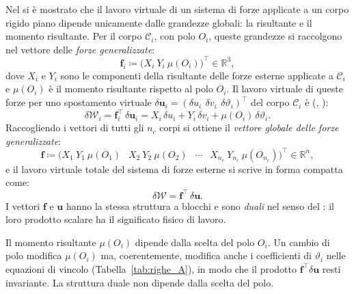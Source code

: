 Nel  si è mostrato che il lavoro virtuale di un
sistema di forze applicate a un corpo rigido piano dipende
unicamente dalle grandezze globali: la risultante e il momento
risultante. Per il corpo $\mathcal{C}_i$, con polo $O_i$,
queste grandezze si raccolgono nel vettore delle
\emph{forze generalizzate}:
\begin{equation}\label{eq:f_i}
	\bm{f}_i \coloneqq
	\bigl(X_i\ Y_i\ \mu(O_i)\bigr)^{\!\top} \in \mathbb{R}^3,
\end{equation}
dove $X_i$ e $Y_i$ sono le componenti della risultante delle
forze esterne applicate a $\mathcal{C}_i$ e $\mu(O_i)$ è il
momento risultante rispetto al polo $O_i$. Il lavoro virtuale
di queste forze per uno spostamento virtuale
$\delta\bm{u}_i = (\delta u_i\,\ \delta v_i\,\ \delta\vartheta_i)^\top$
del corpo $\mathcal{C}_i$ è (,
):
\begin{equation}\label{eq:dW_i}
	\delta\mathcal{W}_i = \bm{f}_i^{\top}\,\delta\bm{u}_i
	= X_i\,\delta u_i + Y_i\,\delta v_i
	+ \mu(O_i)\,\delta\vartheta_i.
\end{equation}
Raccogliendo i vettori di tutti gli $n_c$ corpi si ottiene
il \emph{vettore globale delle forze generalizzate}:
\begin{equation}\label{eq:f_glob}
	\bm{f} \coloneqq
	\bigl(
	X_1\ Y_1\ \mu(O_1)\ \;\;
	X_2\ Y_2\ \mu(O_2)\ \;\;
	\cdots\ \;\;
	X_{n_c}\ Y_{n_c}\ \mu(O_{n_c})
	\bigr)^{\!\top}
	\in \mathbb{R}^{n},
\end{equation}
e il lavoro virtuale totale del sistema di forze esterne si
scrive in forma compatta come:
\begin{equation}\label{eq:dW_tot}
	\delta\mathcal{W} = \bm{f}^{\top}\,\delta\bm{u}.
\end{equation}
I vettori $\bm{f}$ e $\bm{u}$ hanno la stessa struttura a
blocchi e sono \emph{duali} nel senso del : il
loro prodotto scalare ha il significato fisico di lavoro.

\begin{oss}
	Il momento risultante $\mu(O_i)$ dipende dalla scelta del
	polo $O_i$. Un cambio di polo modifica $\mu(O_i)$ ma,
	coerentemente, modifica anche i coefficienti di
	$\vartheta_i$ nelle equazioni di vincolo
	(Tabella~\ref{tab:righe_A}), in modo che il prodotto
	$\bm{f}^\top\delta\bm{u}$ resti invariante. La struttura
	duale non dipende dalla scelta del polo.
\end{oss}


